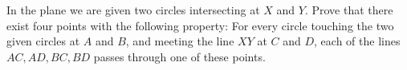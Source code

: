 In the plane we are given two circles intersecting at $X$ and $Y$. Prove that there exist four points with the following property: For every circle touching the two given circles at $A$ and $B$, and meeting the line $XY$ at $C$ and $D$, each of the lines $AC, AD, BC, BD$ passes through one of these points.
